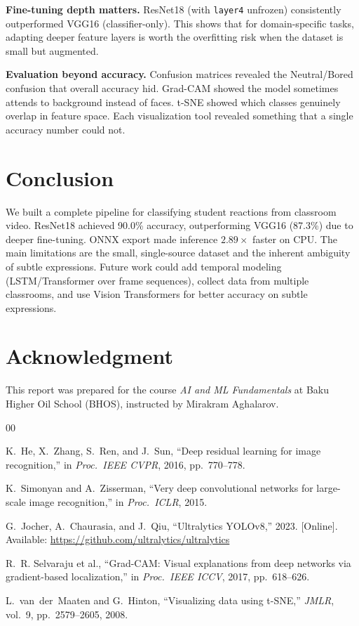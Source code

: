 \documentclass[conference]{IEEEtran}
\begin{document}
\textbf{Fine-tuning depth matters.} ResNet18 (with \texttt{layer4} unfrozen) consistently outperformed VGG16 (classifier-only). This shows that for domain-specific tasks, adapting deeper feature layers is worth the overfitting risk when the dataset is small but augmented.

\textbf{Evaluation beyond accuracy.} Confusion matrices revealed the Neutral/Bored confusion that overall accuracy hid. Grad-CAM showed the model sometimes attends to background instead of faces. t-SNE showed which classes genuinely overlap in feature space. Each visualization tool revealed something that a single accuracy number could not.

\section{Conclusion}

We built a complete pipeline for classifying student reactions from classroom video. ResNet18 achieved 90.0\% accuracy, outperforming VGG16 (87.3\%) due to deeper fine-tuning. ONNX export made inference $2.89\times$ faster on CPU. The main limitations are the small, single-source dataset and the inherent ambiguity of subtle expressions. Future work could add temporal modeling (LSTM/Transformer over frame sequences), collect data from multiple classrooms, and use Vision Transformers for better accuracy on subtle expressions.

\section*{Acknowledgment}

This report was prepared for the course \emph{AI and ML Fundamentals} at Baku Higher Oil School (BHOS), instructed by Mirakram Aghalarov.

\begin{thebibliography}{00}

K.~He, X.~Zhang, S.~Ren, and J.~Sun, ``Deep residual learning for image recognition,'' in \emph{Proc.\ IEEE CVPR}, 2016, pp.~770--778.

K.~Simonyan and A.~Zisserman, ``Very deep convolutional networks for large-scale image recognition,'' in \emph{Proc.\ ICLR}, 2015.

G.~Jocher, A.~Chaurasia, and J.~Qiu, ``Ultralytics YOLOv8,'' 2023. [Online]. Available: \url{https://github.com/ultralytics/ultralytics}

R.~R. Selvaraju et al., ``Grad-CAM: Visual explanations from deep networks via gradient-based localization,'' in \emph{Proc.\ IEEE ICCV}, 2017, pp.~618--626.

L.~van~der~Maaten and G.~Hinton, ``Visualizing data using t-SNE,'' \emph{JMLR}, vol.~9, pp.~2579--2605, 2008.

\end{thebibliography}
\end{document}
